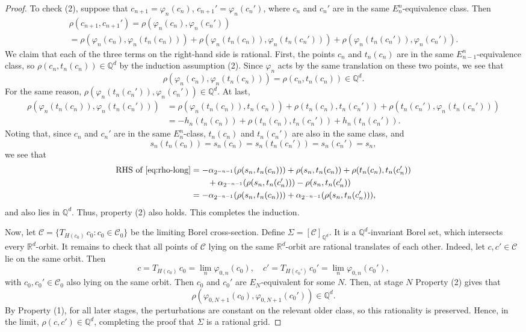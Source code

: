 \documentclass[11pt]{paper}
\newcommand{\bR}{\mathbb R}
\newcommand{\bQ}{\mathbb Q}
\newcommand{\cC}{\mathcal C}
\begin{document}
\begin{proof}
To check (2), suppose that
$c_{n+1}=\varphi_n(c_n)$, $c_{n+1}'=\varphi_n(c_n')$, where $c_n$ and $c_n'$ are
in the same $E_n^n$-equivalence class. Then
\begin{multline*}
\label{eq:rho-complicated}
\rho(c_{n+1}, c_{n+1}') =\rho (\varphi_{n}(c_n), \varphi_{n}(c_n') ) \\
=\rho (\varphi_n(c_n), \varphi_n(t_n(c_n)) )
+ \rho (\varphi_n(t_n(c_n)), \varphi_n(t_n(c_n')))
+\rho (\varphi_n(t_n(c_n')), \varphi_n(c_n')).
\end{multline*}
We claim that each of the three terms on the right-hand side is rational.
First, the points $c_n$ and $t_n(c_n)$ are in the same $E_{n-1}^n$-equivalence class,
so $\rho (c_n, t_n(c_n)) \in \bQ^d$ by the induction assumption (2). Since $\varphi_n$
acts by the same translation on these two points, we see that
 \[ \rho (\varphi_n(c_n), \varphi_n(t_n(c_n)) ) = \rho (c_n, t_n(c_n)) \in \bQ^d. \]
For the same reason, $ \rho (\varphi_n(t_n(c_n')), \varphi_n(c_n')) \in\bQ^d$.
At last,
\begin{align}\label{eq:rho-long}
\nonumber \rho (\varphi_n(t_n(c_n)), \varphi_n(t_n(c_n'))) &=
\rho (\varphi_n (t_n(c_n)), t_n(c_n)) + \rho (t_n(c_n), t_n(c_n'))
+ \rho(t_n(c_n'), \varphi_n (t_n(c_n'))) \\
&= -h_n(t_n(c_n)) + \rho (t_n(c_n), t_n(c_n')) + h_n(t_n(c_n')) .
\end{align}
Noting that, since $c_n$ and $c_n'$ are in the same $E_n^n$-class,
$t_n(c_n)$ and $t_n(c_n')$ are also in the same class, and
\[ s_n(t_n(c_n))=s_n(c_n)=s_n(t_n(c_n'))=s_n(c_n')=s_n, \]
we see that
\begin{align*}
\text{RHS\ of\ }\eqref{eq:rho-long} &=
-\alpha_{2^{-n-1}}(\rho (s_n, t_n(c_n))) + \rho (s_n, t_n(c_n))
+ \rho (t_n(c_n), t_n(c_n'))  \\
&\qquad + \alpha_{2^{-n-1}}(\rho (s_n, t_n(c_n'))) - \rho (s_n, t_n(c_n')) \\
&= -\alpha_{2^{-n-1}}(\rho (s_n, t_n(c_n)))  + \alpha_{2^{-n-1}}(\rho (s_n, t_n(c_n'))),
\end{align*}
and also lies in $\bQ^d$. Thus, property (2) also holds.
This completes the induction.

\medskip
Now, let $\cC = \{T_{H(c_0)}\, c_0\colon c_0\in\cC_0\}$ be the limiting Borel cross-section.
Define $\Sigma = [\cC]_{\bQ^d}$. It is a $\bQ^d$-invariant Borel set, which intersects every
$\bR^d$-orbit. It remains to check that all points of $\cC$ lying on the same $\bR^d$-orbit
are rational translates of each other.
Indeed, let $c, c'\in\cC$ lie on the same orbit. Then
\[
c= T_{H(c_0)}\, c_0 = \lim_n \varphi_{0, n}(c_0), \quad
c'=T_{H(c_0')}\, c_0'   = \lim_n \varphi_{0, n}(c_0'),
\]
with $c_0, c_0'\in\cC_0$ also lying
on the same orbit. Then $c_0$ and $c_0'$ are $E_N$-equivalent for some $N$. Then,
at stage $N$ Property (2) gives that
\[ \rho (\varphi_{0, N+1}(c_0), \varphi_{0, N+1}(c_0'))\in\bQ^d. \]
By Property (1), for all later stages, the perturbations are constant on the relevant older class,
so this rationality is preserved. Hence, in the limit, $\rho(c, c')\in\bQ^d$, completing the proof
that $\Sigma$ is a rational grid.
\end{proof}
\end{document}
